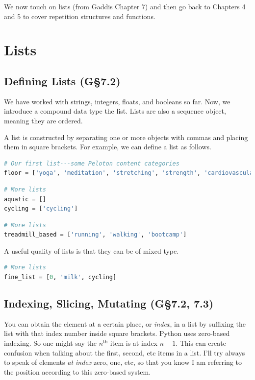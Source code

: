 We now touch on lists (from Gaddis Chapter 7) and then go back to Chapters 4 and 5 to cover repetition structures and functions. 

\section{Lists}

\subsection{Defining Lists (G\S 7.2)}

We have worked with strings, integers, floats, and booleans so far. Now, we introduce a compound data type the list.
Lists are also a sequence object, meaning they are ordered. 

A list is constructed by separating one or more objects with commas and placing them in square brackets. For example, we can define a list as follows.

\begin{lstlisting}[language = Python]
# Our first list---some Peloton content categories
floor = ['yoga', 'meditation', 'stretching', 'strength', 'cardiovascular'] \end{lstlisting}

\begin{lstlisting}[language = Python]
# More lists
aquatic = []
cycling = ['cycling'] \end{lstlisting}

\begin{lstlisting}[language = Python]
# More lists
treadmill_based = ['running', 'walking', 'bootcamp']  \end{lstlisting}

A useful quality of lists is that they can be of mixed type. 

\begin{lstlisting}[language = Python]
# More lists
fine_list = [0, 'milk', cycling]  \end{lstlisting}

\subsection{Indexing, Slicing, Mutating (G\S 7.2, 7.3)}

You can obtain the element at a certain place, or \emph{index}, in a list by suffixing the list with that index number inside square brackets. 
Python uses zero-based indexing. So one might say the $n^{\text{th}}$ item is at index $n-1$. This can create confusion when talking about the first, second, etc items in a list. I'll try always to speak of elements \emph{at index} zero, one, etc, so that you know I am referring to the position according to this zero-based system. 

